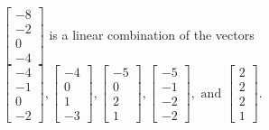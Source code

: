 \begin{exercise}
\begin{exerciseStatement}
  \end{exerciseStatement}
  \begin{exerciseAnswer}
   \(\left[\begin{array}{c}
-8 \\
-2 \\
0 \\
-4
\end{array}\right]\) 
  	 is  
	a linear combination of the vectors \(\left[\begin{array}{c}
-4 \\
-1 \\
0 \\
-2
\end{array}\right] , \left[\begin{array}{c}
-4 \\
0 \\
1 \\
-3
\end{array}\right] , \left[\begin{array}{c}
-5 \\
0 \\
2 \\
1
\end{array}\right] , \left[\begin{array}{c}
-5 \\
-1 \\
-2 \\
-2
\end{array}\right] , \text{ and } \left[\begin{array}{c}
2 \\
2 \\
2 \\
1
\end{array}\right]\).

	
  


  \end{exerciseAnswer}
\end{exercise}